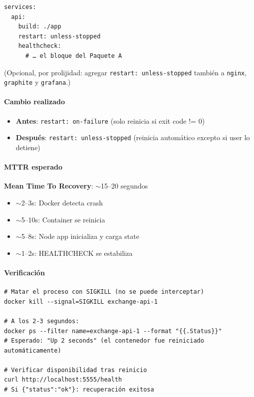 \begin{verbatim}
services:
  api:
    build: ./app
    restart: unless-stopped
    healthcheck:
      # … el bloque del Paquete A
\end{verbatim}

(Opcional, por prolijidad: agregar \texttt{restart: unless-stopped} también a \texttt{nginx}, \texttt{graphite} y \texttt{grafana}.)

\paragraph{Cambio realizado}
\begin{itemize}[leftmargin=*]
    \item \textbf{Antes}: \texttt{restart: on-failure} (solo reinicia si exit code != 0)
    \item \textbf{Después}: \texttt{restart: unless-stopped} (reinicia automático excepto si user lo detiene)
\end{itemize}

\paragraph{MTTR esperado} \textbf{Mean Time To Recovery}: $\sim$15--20 segundos
\begin{itemize}
    \item $\sim$2--3s: Docker detecta crash
    \item $\sim$5--10s: Container se reinicia
    \item $\sim$5--8s: Node app inicializa y carga state
    \item $\sim$1--2s: HEALTHCHECK se estabiliza
\end{itemize}

\paragraph{Verificación}

\begin{verbatim}
# Matar el proceso con SIGKILL (no se puede interceptar)
docker kill --signal=SIGKILL exchange-api-1

# A los 2-3 segundos:
docker ps --filter name=exchange-api-1 --format "{{.Status}}"
# Esperado: "Up 2 seconds" (el contenedor fue reiniciado automáticamente)

# Verificar disponibilidad tras reinicio
curl http://localhost:5555/health
# Si {"status":"ok"}: recuperación exitosa
\end{verbatim}

